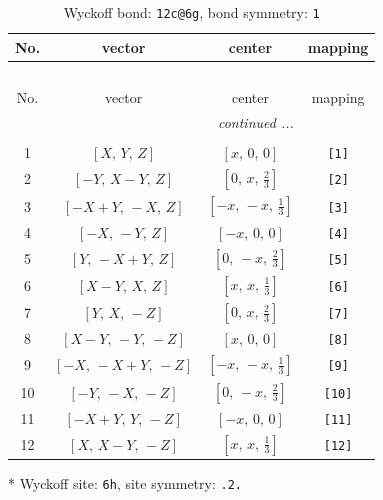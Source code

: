 \documentclass[fleqn,8pt]{jsarticle}
\begin{document}
\begin{longtable}{cccc}
\caption{Wyckoff bond: {\tt 12c@6g}, bond symmetry: {\tt 1}}
 \\
 \hline \hline
No. & vector & center & mapping \\ \hline \endfirsthead

\multicolumn{3}{l}{\tablename\ \thetable{}} \\
 \hline \hline
No. & vector & center & mapping \\ \hline \endhead

 \hline \hline
\multicolumn{3}{r}{\footnotesize\it continued ...} \\ \endfoot

 \hline \hline
\multicolumn{3}{r}{} \\ \endlastfoot

1 & $\left[ X,\, Y,\, Z \right]$ & $\left[ x,\, 0,\, 0 \right]$ & {\tt [1]} \\ \hline
2 & $\left[ - Y,\, X - Y,\, Z \right]$ & $\left[ 0,\, x,\, \frac{2}{3} \right]$ & {\tt [2]} \\ \hline
3 & $\left[ - X + Y,\, - X,\, Z \right]$ & $\left[ - x,\, - x,\, \frac{1}{3} \right]$ & {\tt [3]} \\ \hline
4 & $\left[ - X,\, - Y,\, Z \right]$ & $\left[ - x,\, 0,\, 0 \right]$ & {\tt [4]} \\ \hline
5 & $\left[ Y,\, - X + Y,\, Z \right]$ & $\left[ 0,\, - x,\, \frac{2}{3} \right]$ & {\tt [5]} \\ \hline
6 & $\left[ X - Y,\, X,\, Z \right]$ & $\left[ x,\, x,\, \frac{1}{3} \right]$ & {\tt [6]} \\ \hline
7 & $\left[ Y,\, X,\, - Z \right]$ & $\left[ 0,\, x,\, \frac{2}{3} \right]$ & {\tt [7]} \\ \hline
8 & $\left[ X - Y,\, - Y,\, - Z \right]$ & $\left[ x,\, 0,\, 0 \right]$ & {\tt [8]} \\ \hline
9 & $\left[ - X,\, - X + Y,\, - Z \right]$ & $\left[ - x,\, - x,\, \frac{1}{3} \right]$ & {\tt [9]} \\ \hline
10 & $\left[ - Y,\, - X,\, - Z \right]$ & $\left[ 0,\, - x,\, \frac{2}{3} \right]$ & {\tt [10]} \\ \hline
11 & $\left[ - X + Y,\, Y,\, - Z \right]$ & $\left[ - x,\, 0,\, 0 \right]$ & {\tt [11]} \\ \hline
12 & $\left[ X,\, X - Y,\, - Z \right]$ & $\left[ x,\, x,\, \frac{1}{3} \right]$ & {\tt [12]} \\
\end{longtable}
* Wyckoff site: {\tt 6h}, site symmetry: {\tt .2.}
\end{document}
